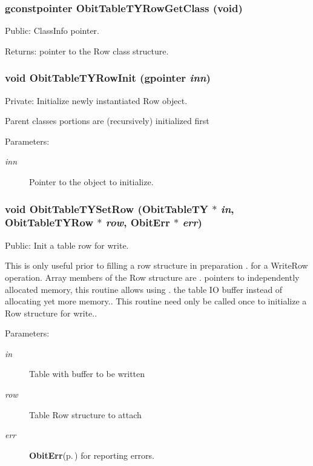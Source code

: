 \subsubsection{\setlength{\rightskip}{0pt plus 5cm}gconstpointer Obit\-Table\-TYRow\-Get\-Class (void)}\label{ObitTableTY_8c_a15}


Public: Class\-Info pointer. 

\begin{Desc}
\item[Returns:]pointer to the Row class structure. \end{Desc}
\subsubsection{\setlength{\rightskip}{0pt plus 5cm}void Obit\-Table\-TYRow\-Init (gpointer {\em inn})}\label{ObitTableTY_8c_a6}


Private: Initialize newly instantiated Row object. 

Parent classes portions are (recursively) initialized first \begin{Desc}
\item[Parameters:]
\begin{description}
\item[{\em inn}]Pointer to the object to initialize. \end{description}
\end{Desc}
\subsubsection{\setlength{\rightskip}{0pt plus 5cm}void Obit\-Table\-TYSet\-Row ({\bf Obit\-Table\-TY} $\ast$ {\em in}, {\bf Obit\-Table\-TYRow} $\ast$ {\em row}, {\bf Obit\-Err} $\ast$ {\em err})}\label{ObitTableTY_8c_a23}


Public: Init a table row for write. 

This is only useful prior to filling a row structure in preparation . for a Write\-Row operation. Array members of the Row structure are . pointers to independently allocated memory, this routine allows using . the table IO buffer instead of allocating yet more memory.. This routine need only be called once to initialize a Row structure for write.. \begin{Desc}
\item[Parameters:]
\begin{description}
\item[{\em in}]Table with buffer to be written \item[{\em row}]Table Row structure to attach \item[{\em err}]{\bf Obit\-Err}{\rm (p.\,\pageref{structObitErr})} for reporting errors. \end{description}
\end{Desc}
